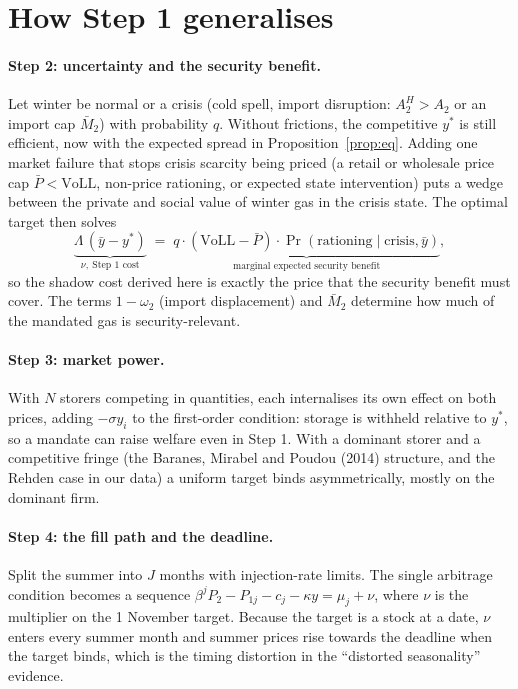 \documentclass[11pt]{article}
\theoremstyle{definition}
\newcommand{\ybar}{\bar y}
\begin{document}
\section{How Step 1 generalises}\label{sec:extensions}

\paragraph{Step 2: uncertainty and the security benefit.} Let winter be normal or a crisis (cold spell, import disruption:
$A_2^H>A_2$ or an import cap $\bar M_2$) with probability $q$. Without frictions, the competitive $y^*$ is still efficient, now
with the expected spread in Proposition~\ref{prop:eq}. Adding one market failure that stops crisis scarcity being priced (a retail
or wholesale price cap $\bar P<\text{VoLL}$, non-price rationing, or expected state intervention) puts a wedge between the private
and social value of winter gas in the crisis state. The optimal target then solves
\[
\underbrace{\Lambda\,(\ybar-y^*)}_{\nu,\ \text{Step 1 cost}} \;=\; \underbrace{q\cdot\left(\text{VoLL}-\bar P\right)\cdot\Pr(\text{rationing}\mid\text{crisis},\ybar)}_{\text{marginal expected security benefit}} ,
\]
so the shadow cost derived here is exactly the price that the security benefit must cover. The terms $1-\omega_2$ (import
displacement) and $\bar M_2$ determine how much of the mandated gas is security-relevant.

\paragraph{Step 3: market power.} With $N$ storers competing in quantities, each internalises its own effect on both prices,
adding $-\sigma y_i$ to the first-order condition: storage is withheld relative to $y^*$, so a mandate can raise welfare even in
Step 1. With a dominant storer and a competitive fringe (the Baranes, Mirabel and Poudou (2014) structure, and the Rehden case
in our data) a uniform target binds asymmetrically, mostly on the dominant firm.

\paragraph{Step 4: the fill path and the deadline.} Split the summer into $J$ months with injection-rate limits. The single
arbitrage condition becomes a sequence $\beta^{j}P_2-P_{1j}-c_j-\kappa y=\mu_j+\nu$, where $\nu$ is the multiplier on the 1 November
target. Because the target is a stock at a date, $\nu$ enters every summer month and summer prices rise towards the deadline
when the target binds, which is the timing distortion in the ``distorted seasonality'' evidence.
\end{document}

